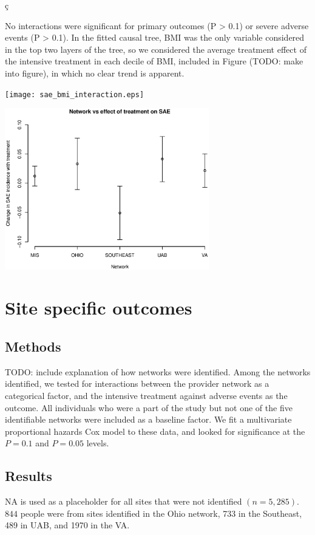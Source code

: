 ç\documentclass[10pt]{article}
\begin{document}
No interactions were significant for primary outcomes (P > 0.1) or severe
adverse events (P > 0.1). In the fitted causal tree, BMI was the only variable
considered in the top two layers of the tree, so we considered the average
treatment effect of the intensive treatment in each decile of BMI, included in
Figure (TODO: make into figure), in which no clear trend is apparent. 

\texttt{[image: sae\_bmi\_interaction.eps]}

\includegraphics[width=3.5in]{sae_network_interaction.eps}

\section{Site specific outcomes}
\subsection{Methods}
TODO: include explanation of how networks were identified.
Among the networks identified, we tested for interactions between the provider
network as a categorical factor, and the intensive treatment against adverse
events as the outcome. All individuals who were a part of the study but not one
of the five identifiable networks were included as a baseline factor. We fit a
multivariate proportional hazards Cox model to these data, and looked for
significance at the $P = 0.1$ and $P=0.05$ levels.

\subsection{Results}
NA is used as a placeholder for all sites that were not identified $(n = 5,285)$. $844$ people were from sites identified in the Ohio network, 733 in the Southeast, 489 in UAB, and 1970 in the VA.
\end{document}
